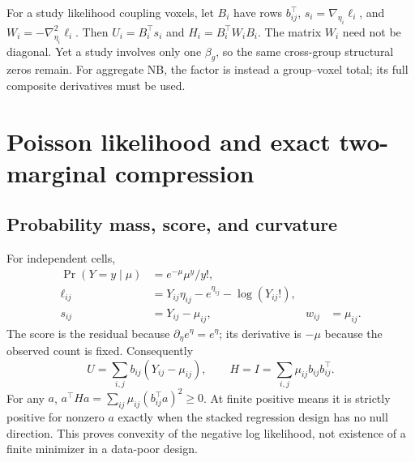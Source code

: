 \documentclass[11pt,a4paper]{article}
\numberwithin{equation}{section}
\begin{document}
For a study likelihood coupling voxels, let $B_i$ have rows $b_{ij}^\top$,
$s_i=\nabla_{\eta_i}\ell_i$, and $W_i=-\nabla_{\eta_i}^2\ell_i$.
Then $U_i=B_i^\top s_i$ and $H_i=B_i^\top W_iB_i$.
The matrix $W_i$ need not be diagonal.
Yet a study involves only one $\beta_g$, so the same cross-group
structural zeros remain. For aggregate NB, the factor is instead a
group--voxel total; its full composite derivatives must be used.

\section{Poisson likelihood and exact two-marginal compression}\label{sec:poisson}

\subsection{Probability mass, score, and curvature}
For independent cells,
\begin{align}
 \Pr(Y=y\mid\mu)&=e^{-\mu}\mu^y/y!,\\
 \ell_{ij}&=Y_{ij}\eta_{ij}-e^{\eta_{ij}}-\log(Y_{ij}!),\\
 s_{ij}&=Y_{ij}-\mu_{ij},&
 w_{ij}&=\mu_{ij}. \label{eq:poisson-cell}
\end{align}
The score is the residual because $\partial_\eta e^\eta=e^\eta$;
its derivative is $-\mu$ because the observed count is fixed.
Consequently
\begin{equation}
 U=\sum_{i,j}b_{ij}(Y_{ij}-\mu_{ij}),\qquad
 H=I=\sum_{i,j}\mu_{ij}b_{ij}b_{ij}^\top.
\end{equation}
For any $a$, $a^\top Ha=\sum_{ij}\mu_{ij}(b_{ij}^\top a)^2\geq0$.
At finite positive means it is strictly positive for nonzero $a$
exactly when the stacked regression design has no null direction.
This proves convexity of the negative log likelihood, not existence
of a finite minimizer in a data-poor design.
\end{document}
